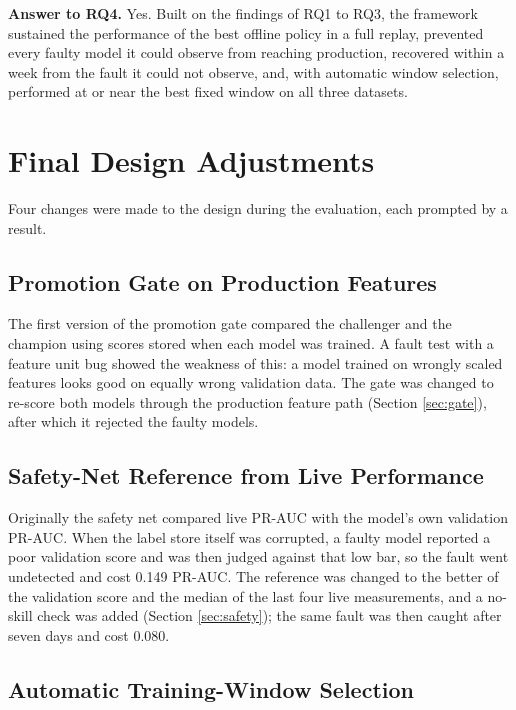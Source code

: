 \textbf{Answer to RQ4.} Yes. Built on the findings of RQ1 to RQ3, the framework sustained the performance of the best offline policy in a full replay, prevented every faulty model it could observe from reaching production, recovered within a week from the fault it could not observe, and, with automatic window selection, performed at or near the best fixed window on all three datasets.

\section{Final Design Adjustments}\label{sec:adjust}

Four changes were made to the design during the evaluation, each prompted by a result.

\subsection{Promotion Gate on Production Features}\label{sec:adj_gate}

The first version of the promotion gate compared the challenger and the champion using scores stored when each model was trained. A fault test with a feature unit bug showed the weakness of this: a model trained on wrongly scaled features looks good on equally wrong validation data. The gate was changed to re-score both models through the production feature path (Section \ref{sec:gate}), after which it rejected the faulty models.

\subsection{Safety-Net Reference from Live Performance}\label{sec:adj_safety}

Originally the safety net compared live PR-AUC with the model's own validation PR-AUC. When the label store itself was corrupted, a faulty model reported a poor validation score and was then judged against that low bar, so the fault went undetected and cost 0.149 PR-AUC. The reference was changed to the better of the validation score and the median of the last four live measurements, and a no-skill check was added (Section \ref{sec:safety}); the same fault was then caught after seven days and cost 0.080.

\subsection{Automatic Training-Window Selection}\label{sec:adj_window}

